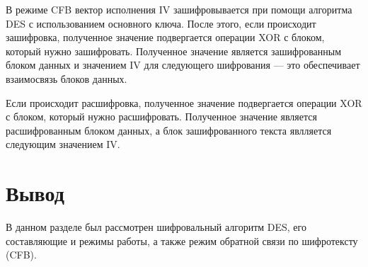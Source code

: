 В режиме CFB вектор исполнения IV зашифровывается при помощи алгоритма DES с использованием основного ключа. После этого, если происходит зашифровка, полученное значение подвергается операции XOR с блоком, который нужно зашифровать. Полученное значение является зашифрованным блоком данных и значением IV для следующего шифрования --- это обеспечивает взаимосвязь блоков данных.

Если происходит расшифровка, полученное значение подвергается операции XOR с блоком, который нужно расшифровать. Полученное значение является расшифрованным блоком данных, а блок зашифрованного текста явлляется следующим значением IV.

\section*{Вывод}

В данном разделе был рассмотрен шифровальный алгоритм DES, его составляющие и режимы работы, а также режим обратной связи по шифротексту (CFB).

